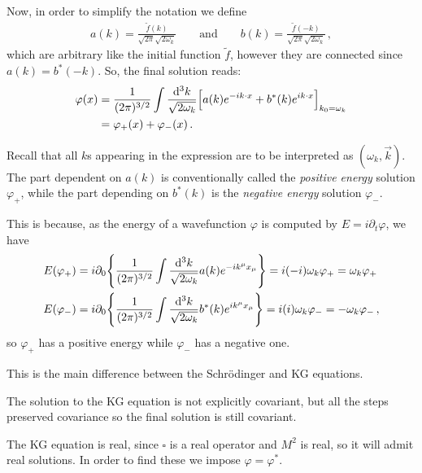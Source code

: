 \documentclass[main.tex]{subfiles}
\begin{document}
Now, in order to simplify the notation we define 
%
\begin{align}
a(k) = \frac{\widetilde{f}(k)}{\sqrt{2\pi } \sqrt{2 \omega_{k}}}
\qquad \text{and} \qquad
b(k) = \frac{\widetilde{f} (-k)}{\sqrt{2 \pi } \sqrt{2 \omega_{k}}}
\,,
\end{align}
%
which are arbitrary like the initial function \(\widetilde{f}\), however they are connected since \(a(k) = b^{*} (-k)\). 
So, the final solution reads: 
%
\begin{subequations}
\begin{align}
\varphi (x) &= \frac{1}{(2 \pi )^{3/2}} \int \frac{ \dd[3]{k}}{\sqrt{2 \omega_{k}}} \qty[a(k) e^{-ik \cdot x} + b^{*}(k) e^{i k \cdot x}]_{k_0 = \omega_{k}}  \\
&= \varphi_{+}(x) + \varphi_{-}(x)
\,.
\end{align}
\end{subequations}

Recall that all \(k\)s appearing in the expression are to be interpreted as \((\omega_{k}, \vec{k})\). 
The part dependent on \(a(k)\) is conventionally called the \emph{positive energy} solution \(\varphi_{+}\), while the part depending on \(b^{*}(k)\) is the \emph{negative energy} solution \(\varphi_{-}\).

This is because, as the energy of a wavefunction \(\varphi \) is computed by \(E = i \partial_{t} \varphi \), we have 
%
\begin{subequations}
\begin{align}
E (\varphi_{+}) &= i \partial_{0} \qty{
  \frac{1}{(2 \pi)^{3/2}} 
  \int \frac{ \dd[3]{k}}{\sqrt{2\omega_{k}}} a(k) e^{-i k^{\mu } x_{\mu }} 
} = i (-i) \omega_{k} \varphi_{+} = \omega_{k} \varphi_{+}  \\
E ( \varphi_{-}) &= i \partial_{0} \qty{
  \frac{1}{(2 \pi)^{3/2}} 
  \int \frac{ \dd[3]{k}}{\sqrt{2\omega_{k}}} b^{*}(k) e^{i k^{\mu } x_{\mu }} 
} = i (i) \omega_{k} \varphi_{-} =- \omega_{k} \varphi_{-}  
\,,
\end{align}
\end{subequations}
%
so \(\varphi_{+}\) has a positive energy while \(\varphi_{-}\) has a negative one. 

This is the main difference between the Schrödinger and KG equations. 

The solution to the KG equation is not explicitly covariant, but all the steps preserved covariance so the final solution is still covariant. 

The KG equation is real, since \(\square\) is a real operator and \(M^2\) is real, so it will admit real solutions. 
In order to find these we impose \(\varphi = \varphi^{*}\). 
\end{document}
